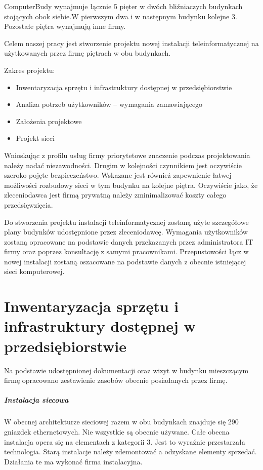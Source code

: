 \documentclass{report}
\begin{document}
ComputerBudy wynajmuje łącznie 5 pięter w dwóch bliźniaczych budynkach stojących obok siebie.W pierwszym dwa i w następnym budynku kolejne 3.
Pozostałe piętra wynajmują inne firmy.

Celem naszej pracy jest stworzenie projektu nowej instalacji teleinformatycznej na użytkowanych przez firmę piętrach w obu budynkach.
\pagebreak[4]

 Zakres projektu:
\begin{itemize}
\item{Inwentaryzacja sprzętu i infrastruktury dostępnej w przedsiębiorstwie}
\item{Analiza potrzeb użytkowników – wymagania zamawiającego}
\item{Założenia projektowe}
\item{Projekt sieci}
 
\end{itemize}
Wnioskując z profilu usług firmy priorytetowe znaczenie podczas projektowania należy nadać niezawodności. Drugim w kolejności czynnikiem jest oczywiście
szeroko pojęte bezpieczeństwo. Wskazane jest również zapewnienie łatwej możliwości rozbudowy sieci w tym budynku na kolejne piętra.
Oczywiście jako, że zleceniodawca jest firmą prywatną należy zminimalizować koszty całego przedsięwzięcia.

Do stworzenia projektu instalacji teleinformatycznej zostaną użyte szczegółowe plany budynków udostępnione przez zleceniodawcę.
Wymagania użytkowników zostaną opracowane na podstawie danych przekazanych przez administratora IT firmy oraz poprzez konsultację
z samymi pracownikami. Przepustowości łącz w nowej instalacji zostaną oszacowane na podstawie danych z obecnie istniejącej sieci komputerowej.

\chapter{Inwentaryzacja sprzętu i infrastruktury dostępnej w przedsiębiorstwie}
Na podstawie udostępnionej dokumentacji oraz wizyt w budynku mieszczącym firmę opracowano zestawienie zasobów obecnie posiadanych przez firmę.

\paragraph{Instalacja siecowa}W obecnej architekturze sieciowej razem w obu budynkach znajduje się 290 gniazdek ethernetowych. Nie wszystkie są obecnie używane.
Całe obecna instalacja opera się na elementach z kategorii 3. Jest to wyraźnie przestarzała technologia. Starą instalacje należy zdemontować a 
odzyskane elementy sprzedać. Działania te ma wykonać firma instalacyjna.
\end{document}
